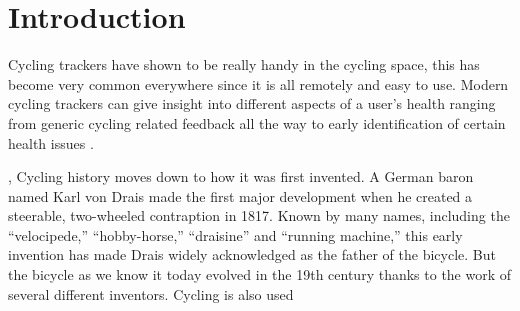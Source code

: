 \documentclass{l4proj}
\begin{document}
%
%
%
%
%
%
%
\chapter{Introduction}


 
Cycling trackers have shown to be really handy in the cycling space, this has become very common everywhere since it is all remotely and easy to use. Modern cycling trackers can give insight into different aspects of a user's health ranging from generic cycling related feedback all the way to early identification of certain health issues \cite{boulos2021mobile}. 

\cite{dyck1976bicycling} , \cite{connollyevolution}Cycling history moves down to how it was first invented. A German baron named Karl von Drais made the first major development when he created a steerable, two-wheeled contraption in 1817. Known by many names, including the “velocipede,” “hobby-horse,” “draisine” and “running machine,” this early invention has made Drais widely acknowledged as the father of the bicycle. But the bicycle as we know it today evolved in the 19th century thanks to the work of several different inventors. Cycling is also used 
\end{document}
